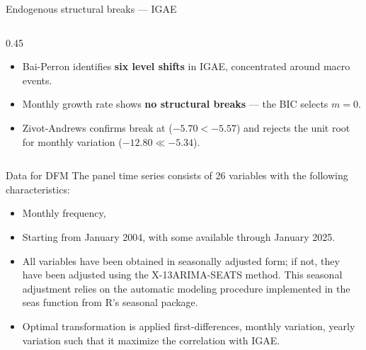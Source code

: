 \documentclass[handout,aspectratio=169,11pt,xcolor={dvipsnames},hyperref={pdftex,pdfpagemode=UseNone,hidelinks,pdfdisplaydoctitle=true},usepdftitle=false]{beamer}
\begin{document}
\begin{frame}{Endogenous structural breaks — IGAE}
\begin{columns}[T]
\begin{column}{0.45\textwidth}
\small
\begin{itemize}

\item Bai-Perron identifies \textbf{six level shifts} in IGAE, concentrated around macro events. 

\vspace{1mm}

\item Monthly growth rate shows \textbf{no structural breaks} — the BIC selects $m = 0$. 

\vspace{1mm}

\item Zivot-Andrews confirms break at ($-5.70 < -5.57$) and rejects the unit root for monthly variation ($-12.80 \ll -5.34$).

\vspace{1.5mm}

\end{itemize}

\end{column}
\end{columns}
\end{frame}


\begin{frame}{Data for DFM}
The panel time series consists of 26 variables with the following characteristics:
\begin{itemize}
\item Monthly frequency, 
\item Starting from January 2004, with some available through January 2025. 
\item All variables have been obtained in seasonally adjusted form; if not, they have been adjusted using the X-13ARIMA-SEATS method. This seasonal adjustment relies on the automatic modeling procedure implemented in the seas function from R’s seasonal package. 
\item Optimal transformation is applied  first-differences, monthly variation, yearly variation such that it maximize the correlation with IGAE.
\end{itemize}

\end{frame}
\end{document}
